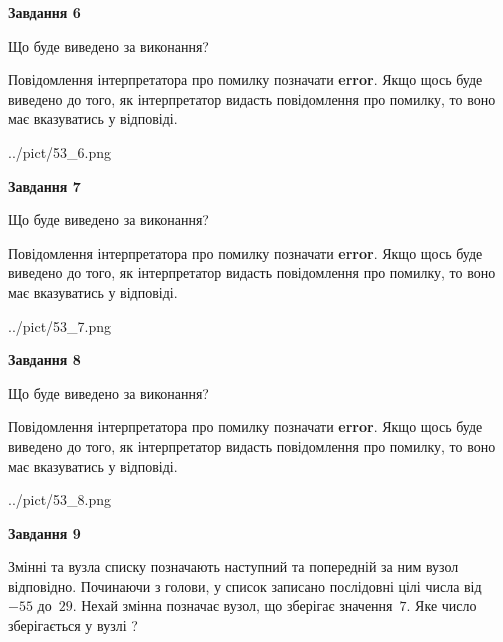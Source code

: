 \documentclass[12pt, ukrainian]{article}
\begin{document}
{\begin {large}
{\begin {center}\textbf{Завдання 6}\end {center}}\par
Що буде виведено за виконання?

Повідомлення інтерпретатора про помилку позначати \textbf{error}.
Якщо щось буде виведено до того, як інтерпретатор видасть повідомлення про помилку, 
то воно має вказуватись у відповіді. \par


\begin{center}
	{../pict/53_6.png}
\end{center}
\newpage

{\begin {center}\textbf{Завдання 7}\end {center}}\par
Що буде виведено за виконання?

Повідомлення інтерпретатора про помилку позначати \textbf{error}.
Якщо щось буде виведено до того, як інтерпретатор видасть повідомлення про помилку, 
то воно має вказуватись у відповіді. \par


\begin{center}
	{../pict/53_7.png}
\end{center}
\newpage

{\begin {center}\textbf{Завдання 8}\end {center}}\par
Що буде виведено за виконання?

Повідомлення інтерпретатора про помилку позначати \textbf{error}.
Якщо щось буде виведено до того, як інтерпретатор видасть повідомлення про помилку, 
то воно має вказуватись у відповіді. \par


\begin{center}
	{../pict/53_8.png}
\end{center}
\newpage

{\begin {center}\textbf{Завдання 9}\end {center}}\par
Змінні  та  вузла списку позначають наступний та попередній за ним вузол відповідно. Починаючи з голови, у список записано послідовні цілі числа від~$-55$ до~$29$. Нехай змінна  позначає вузол, що зберігає значення~$7$.
Яке число зберігається у вузлі  ?\par
\newpage


\end{large}}
\end{document}
